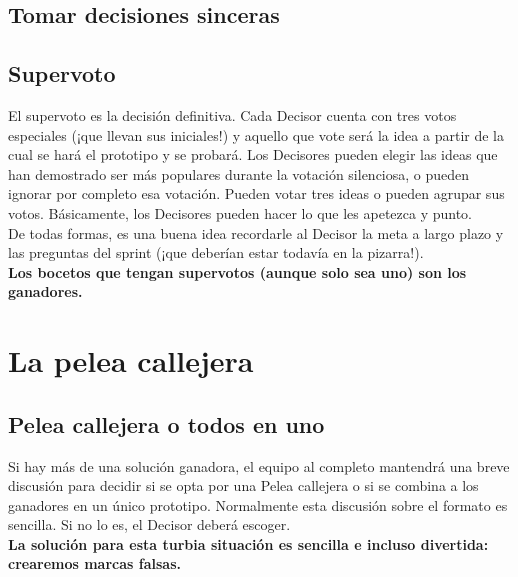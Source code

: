 \documentclass[10pt]{article}
\begin{document}
\begin{multicols}{2}
\subsection*{Tomar decisiones sinceras}
\subsection*{Supervoto}
El supervoto es la decisión definitiva. Cada Decisor cuenta con tres votos especiales (¡que llevan sus iniciales!) y aquello que vote será la idea a partir de la cual se hará el prototipo y se probará. Los Decisores pueden elegir las ideas que han demostrado ser más populares durante la votación silenciosa, o pueden ignorar por completo esa votación. Pueden votar tres ideas o pueden agrupar sus votos. Básicamente, los Decisores pueden hacer lo que les apetezca y punto.\\
De todas formas, es una buena idea recordarle al Decisor la meta a largo plazo y las preguntas del sprint (¡que deberían estar todavía en la pizarra!).\\
\textbf{Los bocetos que tengan supervotos (aunque solo sea uno) son los ganadores.}
\section*{La pelea callejera}
\subsection*{Pelea callejera o todos en uno}
Si hay más de una solución ganadora, el equipo al completo mantendrá una breve discusión para decidir si se opta por una Pelea callejera o si se combina a los ganadores en un único prototipo. Normalmente esta discusión sobre el formato es sencilla. Si no lo es, el Decisor deberá escoger.\\
\textbf{La solución para esta turbia situación es sencilla e incluso divertida: crearemos marcas falsas.}

\end{multicols}
\end{document}
